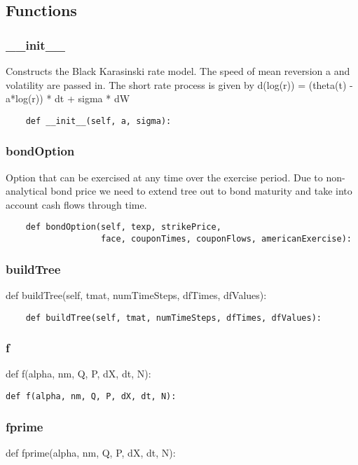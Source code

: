 \documentclass[twoside,11pt]{book}
\begin{document}
\subsection*{Functions}

\subsubsection*{{\bf \_\_init\_\_}}
Constructs the Black Karasinski rate model. The speed of mean reversion a and volatility are passed in. The short rate process is given by d(log(r)) = (theta(t) - a*log(r)) * dt  + sigma * dW  

\begin{lstlisting}
    def __init__(self, a, sigma):
\end{lstlisting}

\subsubsection*{{\bf bondOption}}
Option that can be exercised at any time over the exercise period. Due to non-analytical bond price we need to extend tree out to bond maturity and take into account cash flows through time.  

\begin{lstlisting}
    def bondOption(self, texp, strikePrice,
                   face, couponTimes, couponFlows, americanExercise):
\end{lstlisting}

\subsubsection*{{\bf buildTree}}
def buildTree(self, tmat, numTimeSteps, dfTimes, dfValues): 

\begin{lstlisting}
    def buildTree(self, tmat, numTimeSteps, dfTimes, dfValues):
\end{lstlisting}

\subsubsection*{{\bf f}}
def f(alpha, nm, Q, P, dX, dt, N): 

\begin{lstlisting}
def f(alpha, nm, Q, P, dX, dt, N):
\end{lstlisting}

\subsubsection*{{\bf fprime}}
def fprime(alpha, nm, Q, P, dX, dt, N): 
\end{document}
